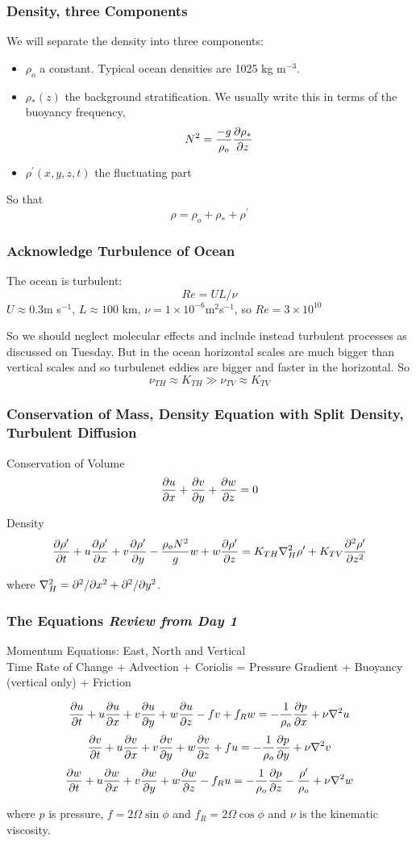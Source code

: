 \documentclass[xcolor=dvipsnames]{beamer}
\begin{document}
\begin{frame}
\frametitle{Density, three Components}

We will separate the density into three components:
\begin{itemize}
\item $\rho_o$ a constant.  Typical ocean densities are 1025 kg m$^{-3}$. 
\item $\rho_*(z)$ the background stratification.  We usually write this in terms of the buoyancy frequency, \[ N^2 = \frac{-g}{\rho_o} \frac{\partial \rho_*}{\partial z} \]
\item $\rho^{\prime}(x,y,z,t)$ the fluctuating part
\end{itemize}
So that
\[ \rho = \rho_o + \rho_* + \rho^{\prime} \]
\end{frame}
\begin{frame}

\frametitle{Acknowledge Turbulence of Ocean}

The ocean is turbulent: 
\[ Re = UL/\nu\]
$U \approx 0.3$m s$^{-1}$, $L \approx 100$ km, $\nu = 1 \times 10^{-6}$m$^2$s$^{-1}$, so $Re = 3 \times 10^{10}$

So we should neglect molecular effects and include instead turbulent processes as discussed on Tuesday.  But in the ocean horizontal scales are much bigger than vertical scales and so turbulenet eddies are bigger and faster in the horizontal. So
\[ \nu_{TH} \approx K_{TH}  \gg \nu_{TV} \approx K_{TV}\]
\end{frame}

\begin{frame}
\frametitle{Conservation of Mass, Density Equation with Split Density, Turbulent Diffusion}
Conservation of Volume\\
\[ \frac {\partial u}{\partial x} + \frac {\partial v}{\partial y} + \frac {\partial w}{\partial z} = 0 \]

Density\\
\[ \frac{\partial\rho^\prime}{\partial t} + u \frac{\partial\rho^\prime}{\partial x} + v \frac{\partial\rho^\prime}{\partial y} -  \frac{\rho_o N^2}g w + w \frac{\partial\rho^\prime}{\partial z} = K_{TH} \nabla_H^2 \rho^\prime + K_{TV}\frac{\partial^2 \rho^\prime}{\partial z^2} \]

where $\nabla_H^2 = \partial^2/\partial x^2 + \partial^2/\partial y^2$.
\end{frame}

\begin{frame}
  \frametitle{The Equations {\it Review from Day 1}}   %
Momentum Equations: East, North and Vertical\\
Time Rate of Change + Advection + Coriolis = Pressure Gradient + Buoyancy (vertical only) + Friction


\[ \frac {\partial u}{\partial t} + u \frac {\partial u}{\partial x} + v \frac {\partial u}{\partial y} + w \frac {\partial u}{\partial z} -fv +f_R w = -\frac{1}{\rho_o} \frac {\partial p}{\partial x} + \nu \nabla^2 u\] 
\[ \frac {\partial v}{\partial t} + u \frac {\partial v}{\partial x} + v \frac {\partial v}{\partial y} + w\frac {\partial v}{\partial z} + fu = -\frac{1}{\rho_o} \frac {\partial p}{\partial y} + \nu \nabla^2 v\]
\[ \frac {\partial w}{\partial t} + u \frac {\partial w}{\partial x} + v \frac {\partial w}{\partial y} + w \frac {\partial w}{\partial z} - f_R u = -\frac{1}{\rho_o} \frac {\partial p}{\partial z} - \frac{\rho^\prime}{\rho_o} + \nu \nabla^2 w \]

where $p$ is pressure, $f = 2\Omega \sin \phi$ and $f_R = 2 \Omega \cos \phi$ and $\nu$ is the kinematic viscosity.

\end{frame}
\end{document}

